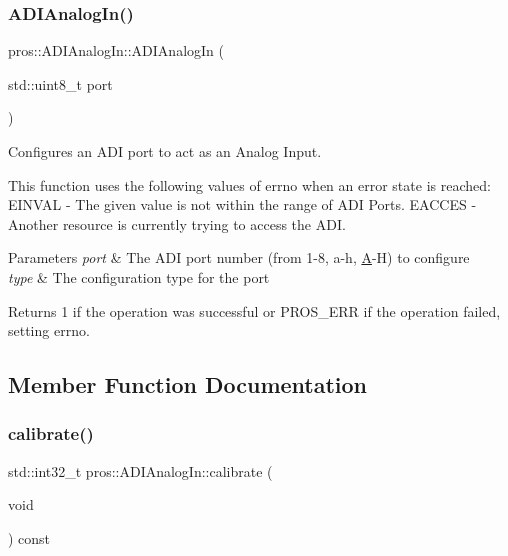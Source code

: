 \subsubsection{\texorpdfstring{ADIAnalogIn()}{ADIAnalogIn()}}
{\footnotesize\ttfamily pros\+::\+A\+D\+I\+Analog\+In\+::\+A\+D\+I\+Analog\+In (\begin{DoxyParamCaption}\item[{std\+::uint8\+\_\+t}]{port }\end{DoxyParamCaption})}



Configures an A\+DI port to act as an Analog Input. 

This function uses the following values of errno when an error state is reached\+: E\+I\+N\+V\+AL -\/ The given value is not within the range of A\+DI Ports. E\+A\+C\+C\+ES -\/ Another resource is currently trying to access the A\+DI.


\begin{DoxyParams}{Parameters}
{\em port} & The A\+DI port number (from 1-\/8, \textquotesingle{}a\textquotesingle{}-\/\textquotesingle{}h\textquotesingle{}, \textquotesingle{}\mbox{\hyperlink{structA}{A}}\textquotesingle{}-\/\textquotesingle{}H\textquotesingle{}) to configure \\
\hline
{\em type} & The configuration type for the port\\
\hline
\end{DoxyParams}
\begin{DoxyReturn}{Returns}
1 if the operation was successful or P\+R\+O\+S\+\_\+\+E\+RR if the operation failed, setting errno. 
\end{DoxyReturn}


\subsection{Member Function Documentation}
\mbox{\label{classpros_1_1ADIAnalogIn_ac8dd1e625cbcec4951d20be0c0fa2d3c}} 
\subsubsection{\texorpdfstring{calibrate()}{calibrate()}}
{\footnotesize\ttfamily std\+::int32\+\_\+t pros\+::\+A\+D\+I\+Analog\+In\+::calibrate (\begin{DoxyParamCaption}\item[{void}]{ }\end{DoxyParamCaption}) const}



